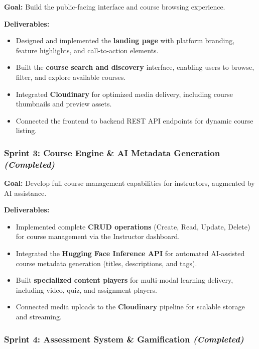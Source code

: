 \textbf{Goal:} Build the public-facing interface and course browsing experience.

\textbf{Deliverables:}
\begin{itemize}
    \item Designed and implemented the \textbf{landing page} with platform branding, feature highlights, and call-to-action elements.
    \item Built the \textbf{course search and discovery} interface, enabling users to browse, filter, and explore available courses.
    \item Integrated \textbf{Cloudinary} for optimized media delivery, including course thumbnails and preview assets.
    \item Connected the frontend to backend REST API endpoints for dynamic course listing.
\end{itemize}

\subsubsection*{Sprint 3: Course Engine \& AI Metadata Generation \hfill \textit{(Completed)}}

\textbf{Goal:} Develop full course management capabilities for instructors, augmented by AI assistance.

\textbf{Deliverables:}
\begin{itemize}
    \item Implemented complete \textbf{CRUD operations} (Create, Read, Update, Delete) for course management via the Instructor dashboard.
    \item Integrated the \textbf{Hugging Face Inference API} for automated AI-assisted course metadata generation (titles, descriptions, and tags).
    \item Built \textbf{specialized content players} for multi-modal learning delivery, including video, quiz, and assignment players.
    \item Connected media uploads to the \textbf{Cloudinary} pipeline for scalable storage and streaming.
\end{itemize}

\subsubsection*{Sprint 4: Assessment System \& Gamification \hfill \textit{(Completed)}}

